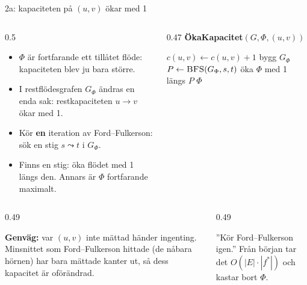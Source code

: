 \begin{frame}{2a: kapaciteten på $(u,v)$ ökar med 1}
\begin{columns}[T]
\begin{column}{0.5\textwidth}
\small
\begin{itemize}\setlength{\itemsep}{3pt}
  \item $\Phi$ är fortfarande ett tillåtet flöde: kapaciteten blev ju bara större.
  \item I restflödesgrafen $G_\Phi$ ändras en enda sak: restkapaciteten $u\to v$ ökar med 1.
  \item Kör \textbf{en} iteration av Ford--Fulkerson: sök en stig $s\leadsto t$ i $G_\Phi$.
  \item Finns en stig: öka flödet med 1 längs den. Annars är $\Phi$ fortfarande maximalt.
\end{itemize}
\end{column}
\begin{column}{0.47\textwidth}
{\small\bfseries\color{kthnavy}ÖkaKapacitet$(G,\Phi,(u,v))$}
\footnotesize
\begin{algorithmic}[1]
\State $c(u,v)\gets c(u,v)+1$
\State bygg $G_\Phi$ 
\State $P\gets\textsc{BFS}(G_\Phi,s,t)$ 
  \State öka $\Phi$ med 1 längs $P$ 
\EndIf
\State \Return $\Phi$
\end{algorithmic}
\end{column}
\end{columns}
\vfill
\begin{columns}[T]
\begin{column}{0.49\textwidth}
\begin{ahabox}[fontupper=\footnotesize]
\textbf{Genväg:} var $(u,v)$ inte mättad händer ingenting. Minsnittet som Ford--Fulkerson hittade
(de nåbara hörnen) har bara mättade kanter ut, så dess kapacitet är oförändrad.
\end{ahabox}
\end{column}
\begin{column}{0.49\textwidth}
\begin{missbox}[fontupper=\footnotesize]
”Kör Ford--Fulkerson igen.” Från början tar det $O(|E|\cdot|f^*|)$ och kastar bort $\Phi$.
\end{missbox}
\end{column}
\end{columns}
\end{frame}

